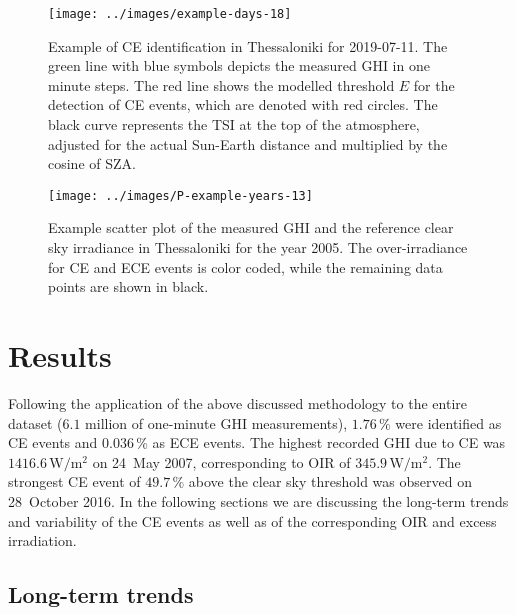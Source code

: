 \documentclass[preprint, 5p,
authoryear]{elsarticle} %
\begin{document}
\begin{figure}[H]

{\centering \texttt{[image: ../images/example-days-18]} 

}

\caption{Example of CE identification in Thessaloniki for 2019-07-11. The green line with blue symbols depicts the measured GHI in one minute steps. The red line shows the modelled threshold $E$ for the detection of CE events, which are denoted with red circles. The black curve represents the TSI at the top of the atmosphere, adjusted for the actual Sun-Earth distance and multiplied by the cosine of SZA.}\label{fig:example-day}
\end{figure}

\begin{figure}[H]

{\centering \texttt{[image: ../images/P-example-years-13]} 

}

\caption{Example scatter plot of the measured GHI and the reference clear sky irradiance in Thessaloniki for the year 2005. The over-irradiance for CE and ECE events is color coded, while the remaining data points are shown in black.}\label{fig:example-year}
\end{figure}

\hypertarget{results}{%
\section{Results}\label{results}}

Following the application of the above discussed methodology to the
entire dataset (\(6.1\) million of one-minute GHI measurements),
\(1.76\,\%\) were identified as CE events and \(0.036\,\%\) as ECE
events. The highest recorded GHI due to CE was
\(1416.6\,\text{W}/\text{m}^2\) on 24~May 2007, corresponding to OIR of
\(345.9\,\text{W}/\text{m}^2\). The strongest CE event of \(49.7\,\%\)
above the clear sky threshold was observed on 28~October 2016. In the
following sections we are discussing the long-term trends and
variability of the CE events as well as of the corresponding OIR and
excess irradiation.

\hypertarget{long-term-trends}{%
\subsection{Long-term trends}\label{long-term-trends}}
\end{document}
